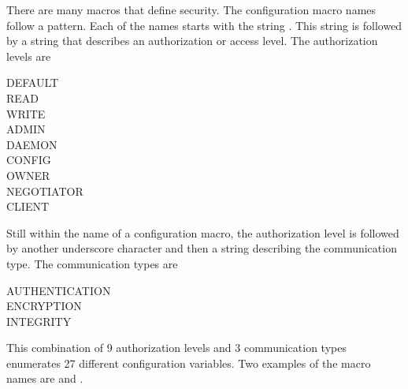 

There are many macros that define security.
The configuration macro names follow a pattern.
Each of the names starts with the string
.
This string is followed by a string that describes an
authorization or access level.
The authorization levels are
\begin{description}
    \item[DEFAULT]
    \item[READ]
    \item[WRITE]
    \item[ADMIN]
    \item[DAEMON]
    \item[CONFIG]
    \item[OWNER]
    \item[NEGOTIATOR]
    \item[CLIENT]
\end{description}
Still within the name of a configuration macro,
the authorization level is followed by another underscore
character and then a string describing the communication type.
The communication types are
\begin{description}
    \item[AUTHENTICATION]
    \item[ENCRYPTION]
    \item[INTEGRITY]
\end{description}
This combination of 9 authorization levels and 3 communication types
enumerates 27 different configuration variables.
Two examples of the macro names are
and
.

